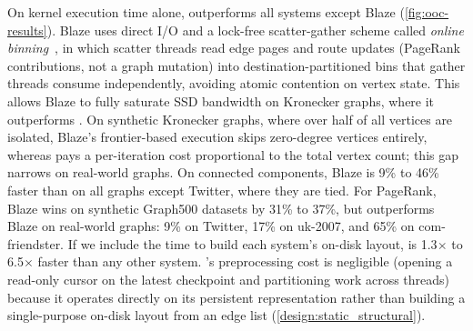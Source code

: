 On kernel execution time alone, \project{} outperforms all systems except Blaze (\autoref{fig:ooc-results}).
Blaze uses direct I/O and a lock-free scatter-gather scheme called \emph{online binning}~\cite{kim2022blaze}, in which scatter threads read edge pages and route updates (PageRank contributions, not a graph mutation) into destination-partitioned bins that gather threads consume independently, avoiding atomic contention on vertex state.
This allows Blaze to fully saturate SSD bandwidth on Kronecker graphs,
where it outperforms \project{}.
On synthetic Kronecker graphs, where over half of all vertices are isolated, Blaze's frontier-based execution skips zero-degree vertices entirely, whereas \project{} pays a per-iteration cost proportional to the total vertex count; this gap narrows on real-world graphs.
On connected components, Blaze is 9\% to 46\% faster than \project{} on all graphs except Twitter, where they are tied.
For PageRank, Blaze wins on synthetic Graph500 datasets by 31\% to 37\%, but \project{} outperforms Blaze on real-world graphs: 9\% on Twitter, 17\% on uk-2007, and 65\% on com-friendster.
If we include the time to build each system's on-disk layout, \project{} is 1.3$\times$ to 6.5$\times$ faster than any other system.
\project{}'s preprocessing cost is negligible (opening a read-only cursor on the latest checkpoint and partitioning work across threads) because it operates directly on its persistent representation rather than building a single-purpose on-disk layout from an edge list (\autoref{design:static_structural}).

